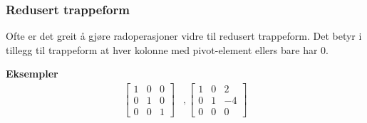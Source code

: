 \documentclass[12pt,a4paper,norsk]{article}
\begin{document}
\subsubsection{Redusert trappeform}
Ofte er det greit å gjøre radoperasjoner vidre til redusert trappeform. Det
betyr i tillegg til trappeform at hver kolonne med pivot-element ellers bare har
0.

\textbf{Eksempler}
\begin{align*}
  \begin{bmatrix}
    1 & 0 & 0 \\
    0 & 1 & 0 \\
    0 & 0 & 1
  \end{bmatrix}
  &,
  \begin{bmatrix}
    1 & 0 & 2 \\
    0 & 1 & -4 \\
    0 & 0 & 0
  \end{bmatrix}
\end{align*}
\end{document}
